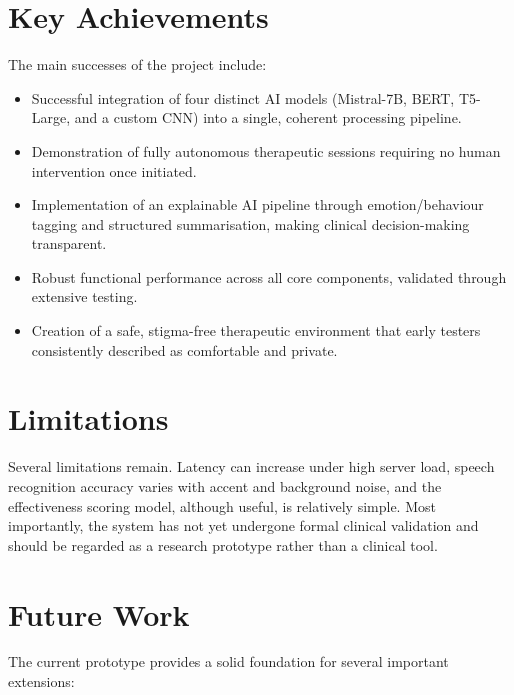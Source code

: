 \section{Key Achievements}

The main successes of the project include:

\begin{itemize}
    \item Successful integration of four distinct AI models (Mistral-7B, BERT, T5-Large, and a custom CNN) into a single, coherent processing pipeline.
    \item Demonstration of fully autonomous therapeutic sessions requiring no human intervention once initiated.
    \item Implementation of an explainable AI pipeline through emotion/behaviour tagging and structured summarisation, making clinical decision-making transparent.
    \item Robust functional performance across all core components, validated through extensive testing.
    \item Creation of a safe, stigma-free therapeutic environment that early testers consistently described as comfortable and private.
\end{itemize}

\section{Limitations}

Several limitations remain. Latency can increase under high server load, speech recognition accuracy varies with accent and background noise, and the effectiveness scoring model, although useful, is relatively simple. Most importantly, the system has not yet undergone formal clinical validation and should be regarded as a research prototype rather than a clinical tool.

\section{Future Work}

The current prototype provides a solid foundation for several important extensions:


